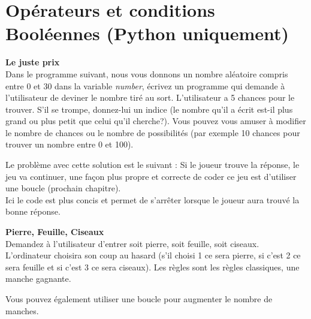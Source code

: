 \section{Opérateurs et conditions Booléennes (Python uniquement)}

\begin{Exercice}[20 minutes] \textbf{Le juste prix }\\
  Dans le programme suivant, nous vous donnons un nombre aléatoire compris entre 0 et 30 dans la variable \textit{number}, écrivez un programme qui demande à l'utilisateur de deviner le nombre tiré au sort. L'utilisateur a 5 chances pour le trouver. S'il se trompe, donnez-lui un indice (le nombre qu'il a écrit est-il plus grand ou plus petit que celui qu'il cherche?). Vous pouvez vous amuser à modifier le nombre de chances ou le nombre de possibilités (par exemple 10 chances pour trouver un nombre entre 0 et 100).   \\
  
  
  
  \begin{solution}
   
   
   Le problème avec cette solution est le suivant : Si le joueur trouve la réponse, le jeu va continuer, une façon plus propre et correcte de coder ce jeu est d'utiliser une boucle (prochain chapitre). \\
   
   
   
  	Ici le code est plus concis et permet de s'arrêter lorsque le joueur aura trouvé la bonne réponse.\\
           
    \end{solution}   
\end{Exercice}

\begin{Exercice}[20 minutes] \textbf{Pierre, Feuille, Ciseaux }\\
  Demandez à l'utilisateur d'entrer soit pierre, soit feuille, soit ciseaux. L'ordinateur choisira son coup au hasard (s'il choisi 1 ce sera pierre, si c'est 2 ce sera feuille et si c'est 3 ce sera ciseaux). Les règles sont les règles classiques, une manche gagnante.   \\
  
  
   
    \begin{solution}
    
    
    
    Vous pouvez également utiliser une boucle pour augmenter le nombre de manches. \\
           
    \end{solution}   
\end{Exercice}



